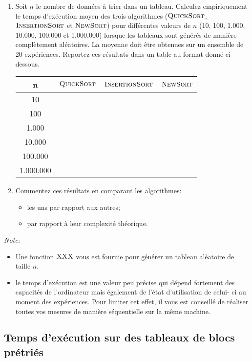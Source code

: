 \documentclass[a4paper,10pt]{article}
\begin{document}
\begin{enumerate}
\item Soit $n$ le nombre de données à trier dans un tableau. Calculez
empiriquement le temps d'exécution moyen des trois algorithmes
($\textnormal{\scshape QuickSort}$, $\textnormal{\scshape InsertionSort}$ et $\textnormal{\scshape NewSort}$) pour
différentes valeurs de $n$ (10, 100, 1.000, 10.000, 100.000 et
1.000.000) lorsque les tableaux sont générés de manière complètement
aléatoires. La moyenne doit être obtenues sur un ensemble de 20
expériences. Reportez ces résultats dans un table au format donné ci-dessous.

\begin{center}
\begin{tabular}{cccc}
	\hline
	n & $\textnormal{\scshape QuickSort}$ & $\textnormal{\scshape InsertionSort}$ & $\textnormal{\scshape NewSort}$ \\
	\hline
	10 & & & \\
	100 & & &\\
	1.000 & & &\\
	10.000 & & &\\
	100.000 & & &\\
	1.000.000 & & &\\
\end{tabular}
\end{center}

\item Commentez ces résultats en comparant les algorithmes:
\begin{itemize}
\item les uns par rapport aux autres;
\item par rapport à leur complexité théorique.
\end{itemize}
\end{enumerate}

{\em Note:} 
\begin{itemize}
\item Une fonction $\textnormal{\scshape XXX}$ vous est fournie pour générer un tableau aléatoire de taille $n$.
\item le temps d'exécution est une valeur peu précise qui dépend fortement
des capacités de l'ordinateur mais également de l'état d'utilisation de celui-
ci au moment des expériences. Pour limiter cet effet, il vous est conseillé
de réaliser toutes vos mesures de manière séquentielle sur la même machine.
\end{itemize}

\subsection{Temps d'exécution sur des tableaux de blocs prétriés}
\end{document}
